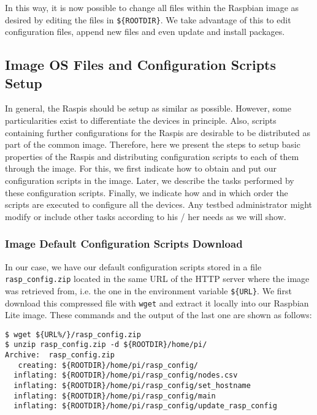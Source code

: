 In this way, it is now possible to change all files within the Raspbian
image as desired by editing the files in \texttt{\$\{ROOTDIR\}}. We take
advantage of this to edit configuration files, append new files and even
update and install packages.

\subsection{Image OS Files and Configuration Scripts Setup}
In general, the \ac{Raspi}s should be setup as similar as possible. However,
some particularities exist to differentiate the devices in principle. Also,
scripts containing further configurations for the \ac{Raspi}s are desirable
to be distributed as part of the common image. Therefore, here we present
the steps to setup basic properties of the \ac{Raspi}s and distributing
configuration scripts to each of them through the image. For this, we first
indicate how to obtain and put our configuration scripts in the image. Later,
we describe the tasks performed by these configuration scripts. Finally, we
indicate how and in which order the scripts are executed to configure all the
devices. Any testbed administrator might modify or include other
tasks according to his / her needs as we will show.

\subsubsection{Image Default Configuration Scripts Download}
\label{sec:configuration_files_download}
In our case, we have our default configuration scripts stored in a
file \texttt{rasp\_config.zip} located in the same \ac{URL} of the
\ac{HTTP} server where the image was retrieved from, i.e. the one in
the environment variable \texttt{\$\{URL\}}. We first download
this compressed file with \texttt{wget} and extract it locally into our
Raspbian Lite image. These commands and the output of the last one are
shown as follows:

\begin{lstlisting}[]
$ wget ${URL%/}/rasp_config.zip
$ unzip rasp_config.zip -d ${ROOTDIR}/home/pi/
Archive:  rasp_config.zip
   creating: ${ROOTDIR}/home/pi/rasp_config/
  inflating: ${ROOTDIR}/home/pi/rasp_config/nodes.csv
  inflating: ${ROOTDIR}/home/pi/rasp_config/set_hostname
  inflating: ${ROOTDIR}/home/pi/rasp_config/main
  inflating: ${ROOTDIR}/home/pi/rasp_config/update_rasp_config
\end{lstlisting}
\FloatBarrier
\vspace{-5mm}

